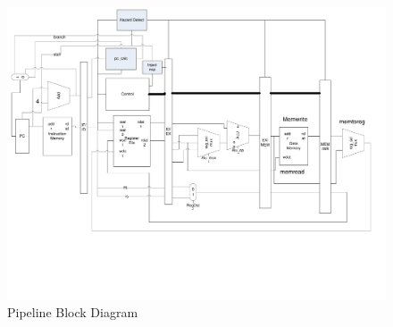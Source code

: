 \documentclass[12pt]{article}
\begin{document}
\begin{landscape}

\begin{figure}
	\begin{center}
		\includegraphics[width=7in]{bld_pipeline_branch}
	\end{center}
	\caption{Pipeline Block Diagram}
	\label{fig:pipeline}
\end{figure}

\end{landscape}

\newpage
\end{document}
